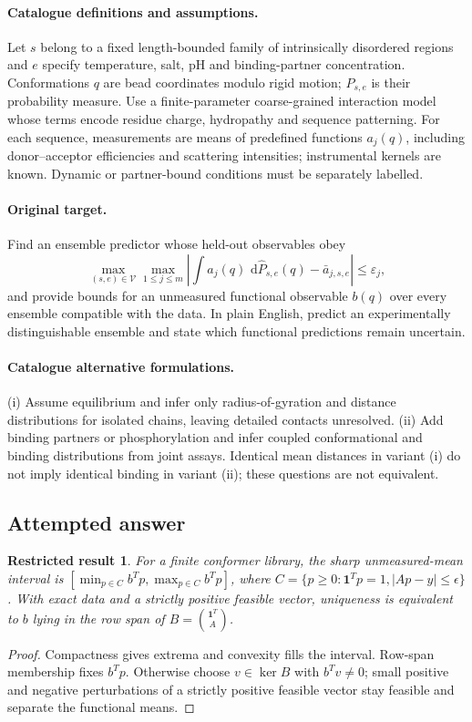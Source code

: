 \documentclass[11pt]{article}
\newcommand{\dd}{\,\mathrm d}
\newtheorem{attemptresult}{Restricted result}[section]
\begin{document}
\paragraph{Catalogue definitions and assumptions.}
Let $s$ belong to a fixed length-bounded family of intrinsically disordered regions and $e$ specify temperature, salt, pH and binding-partner concentration. Conformations $q$ are bead coordinates modulo rigid motion; $P_{s,e}$ is their probability measure. Use a finite-parameter coarse-grained interaction model whose terms encode residue charge, hydropathy and sequence patterning. For each sequence, measurements are means of predefined functions $a_j(q)$, including donor--acceptor efficiencies and scattering intensities; instrumental kernels are known. Dynamic or partner-bound conditions must be separately labelled.
\paragraph{Original target.}
Find an ensemble predictor whose held-out observables obey
\[
\max_{(s,e)\in\mathcal V}\max_{1\leq j\leq m}
\left|\int a_j(q)\,\dd\widehat P_{s,e}(q)-\bar a_{j,s,e}\right|\leq\varepsilon_j,
\]
and provide bounds for an unmeasured functional observable $b(q)$ over every ensemble compatible with the data. In plain English, predict an experimentally distinguishable ensemble and state which functional predictions remain uncertain.
\paragraph{Catalogue alternative formulations.}
(i) Assume equilibrium and infer only radius-of-gyration and distance distributions for isolated chains, leaving detailed contacts unresolved. (ii) Add binding partners or phosphorylation and infer coupled conformational and binding distributions from joint assays. Identical mean distances in variant (i) do not imply identical binding in variant (ii); these questions are not equivalent.
\subsection{Attempted answer}
\begin{attemptresult}
For a finite conformer library, the sharp unmeasured-mean interval is $[\min_{p\in C}b^Tp,\max_{p\in C}b^Tp]$, where $C=\{p\geq0:\mathbf1^Tp=1,|Ap-y|\leq\epsilon\}$. With exact data and a strictly positive feasible vector, uniqueness is equivalent to $b$ lying in the row span of $B=\binom{\mathbf1^T}{A}$.
\end{attemptresult}
\begin{proof}
Compactness gives extrema and convexity fills the interval. Row-span membership fixes $b^Tp$. Otherwise choose $v\in\ker B$ with $b^Tv\ne0$; small positive and negative perturbations of a strictly positive feasible vector stay feasible and separate the functional means.
\end{proof}
\end{document}
